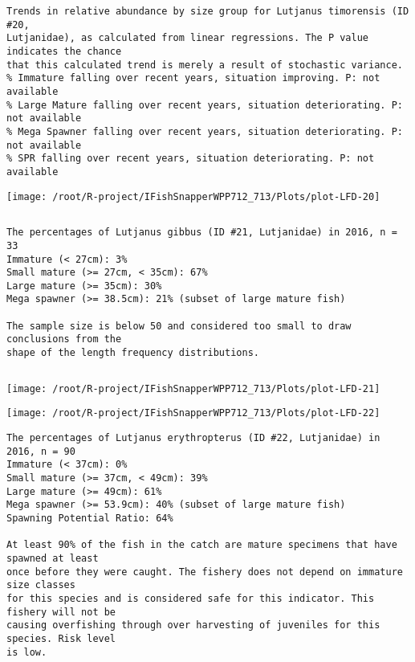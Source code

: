 \documentclass{report}\usepackage[]{graphicx}\usepackage[]{color}
\makeatletter
\def\maxwidth{ %
  \ifdim\Gin@nat@width>\linewidth
    \linewidth
  \else
    \Gin@nat@width
  \fi
}
\newenvironment{kframe}{%
 \def\at@end@of@kframe{}%
 \ifinner\ifhmode%
  \def\at@end@of@kframe{\end{minipage}}%
  \begin{minipage}{\columnwidth}%
 \fi\fi%
 \def\FrameCommand##1{\hskip\@totalleftmargin \hskip-\fboxsep
 \colorbox{shadecolor}{##1}\hskip-\fboxsep
     \hskip-\linewidth \hskip-\@totalleftmargin \hskip\columnwidth}%
 \MakeFramed {\advance\hsize-\width
   \@totalleftmargin\z@ \linewidth\hsize
   \@setminipage}}%
 {\par\unskip\endMakeFramed%
 \at@end@of@kframe}
\newenvironment{knitrout}{}{} %
\makeatother
\begin{document}
\begin{knitrout}
\begin{kframe}
\begin{verbatim}
Trends in relative abundance by size group for Lutjanus timorensis (ID #20,
Lutjanidae), as calculated from linear regressions. The P value indicates the chance
that this calculated trend is merely a result of stochastic variance.
% Immature falling over recent years, situation improving. P: not available
% Large Mature falling over recent years, situation deteriorating. P: not available
% Mega Spawner falling over recent years, situation deteriorating. P: not available
% SPR falling over recent years, situation deteriorating. P: not available
\end{verbatim}
\end{kframe}
\texttt{[image: /root/R-project/IFishSnapperWPP712\_713/Plots/plot-LFD-20]} 
\begin{kframe}\begin{verbatim}
\end{verbatim}
\end{kframe}
\clearpage
\newpage
\begin{kframe}\begin{verbatim}
The percentages of Lutjanus gibbus (ID #21, Lutjanidae) in 2016, n = 33
Immature (< 27cm): 3%
Small mature (>= 27cm, < 35cm): 67%
Large mature (>= 35cm): 30%
Mega spawner (>= 38.5cm): 21% (subset of large mature fish)
 
The sample size is below 50 and considered too small to draw conclusions from the
shape of the length frequency distributions.
\end{verbatim}
\end{kframe}
\newpage
\begin{kframe}\begin{verbatim}
\end{verbatim}
\end{kframe}
\texttt{[image: /root/R-project/IFishSnapperWPP712\_713/Plots/plot-LFD-21]} 

\texttt{[image: /root/R-project/IFishSnapperWPP712\_713/Plots/plot-LFD-22]} 
\begin{kframe}\begin{verbatim}
The percentages of Lutjanus erythropterus (ID #22, Lutjanidae) in 2016, n = 90
Immature (< 37cm): 0%
Small mature (>= 37cm, < 49cm): 39%
Large mature (>= 49cm): 61%
Mega spawner (>= 53.9cm): 40% (subset of large mature fish)
Spawning Potential Ratio: 64%
 
At least 90% of the fish in the catch are mature specimens that have spawned at least
once before they were caught. The fishery does not depend on immature size classes
for this species and is considered safe for this indicator. This fishery will not be
causing overfishing through over harvesting of juveniles for this species. Risk level
is low.


\end{verbatim}
\end{kframe}
\end{knitrout}
\end{document}

